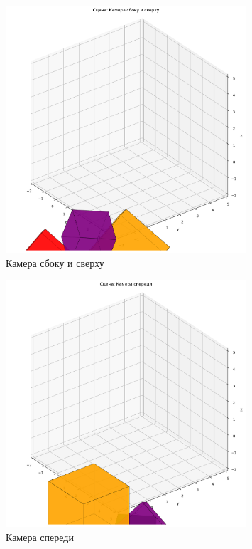 \begin{figure}[H]
\centering
\includegraphics[width=0.8\textwidth]{images/task6/camera_side_top.png}
\caption{Камера сбоку и сверху}
\end{figure}

\begin{figure}[H]
\centering
\includegraphics[width=0.8\textwidth]{images/task6/camera_front.png}
\caption{Камера спереди}
\end{figure}


